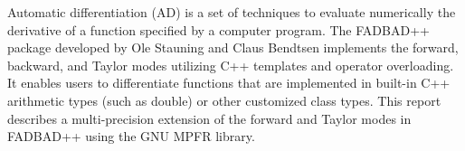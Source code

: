 Automatic differentiation (AD) is a set of techniques to evaluate numerically the derivative of a function specified by a computer program. The FADBAD++ package developed by Ole Stauning and Claus Bendtsen implements the forward, backward, and Taylor modes utilizing C++ templates and operator overloading. 
It enables users to differentiate functions that are implemented in built-in C++ arithmetic types (such as double) or other customized class types. This report describes a multi-precision extension of the forward and Taylor modes in FADBAD++  using the GNU MPFR library.